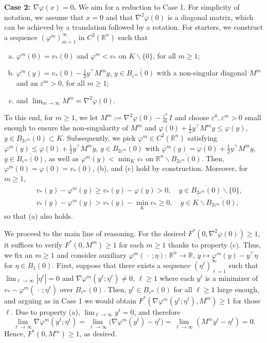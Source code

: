 \documentclass[11pt]{amsart}
\numberwithin{equation}{section}
\newcommand{\rr}{\mathbb{R}}
\begin{document}
\medskip

\noindent\textbf{Case 2: $\nabla\varphi(x)=0$.} We aim for a reduction to Case 1. For simplicity of notation, we assume that $x=0$ and that $\nabla^2\varphi(0)$ is a diagonal matrix, which can be achieved by a translation followed by a rotation. For starters, we construct a sequence $(\varphi^m)_{m=1}^\infty$ in $C^2(\rr^n)$ such that
\begin{enumerate}[(a)]
\item $\varphi^m(0)=v_*(0)$ and $\varphi^m<v_*$ on $K\backslash\{0\}$, for all $m\ge1$; 
\item $\varphi^m(y)=v_*(0)-\frac{1}{2}y^\top M^my$, $y\in\overline{B_{\varepsilon^m}(0)}$ with a non-singular diagonal $M^m$ and an $\varepsilon^m>0$, for all $m\ge1$; 
\item and $\lim_{m\to\infty} M^m=\nabla^2\varphi(0)$. 
\end{enumerate}
To this end, for $m\ge1$, we let $M^m:=\nabla^2\varphi(0)-\frac{\varepsilon^0}{m}\,I$ and choose $\varepsilon^0,\varepsilon^m>0$ small enough to ensure the non-singularity of $M^m$ and $\varphi(0)+\frac{1}{2}y^\top M^m y\le \varphi(y)$, $y\in \overline{B_{2\varepsilon^m}(0)}\subset K$. Subsequently, we pick $\varphi^m\in C^2(\rr^n)$ satisfying $\varphi^m(y)\le\varphi(0)+\frac{1}{2}y^\top M^m y$, $y\in \overline{B_{2\varepsilon^m}(0)}$ with $\varphi^m(y)=\varphi(0)+\frac{1}{2}y^\top M^m y$, $y\in \overline{B_{\varepsilon^m}(0)}$, as well as $\varphi^m(y)<\min_K v_*$ on $\rr^n\backslash \overline{B_{2\varepsilon^m}(0)}$. Then, $\varphi^m(0)=\varphi(0)=v_*(0)$, (b), and (c) hold by construction. Moreover, for $m\ge1$,
\begin{eqnarray}
&& v_*(y)-\varphi^m(y)\ge v_*(y)-\varphi(y)>0,\quad y\in \overline{B_{2\varepsilon^m}(0)}\backslash\{0\}, \\
&& v_*(y)-\varphi^m(y)>v_*(y)-\min_K v_*\ge 0,\quad y\in K\backslash \overline{B_{2\varepsilon^m}(0)},
\end{eqnarray}
 so that (a) also holds. 
 
\medskip

We proceed to the main line of reasoning. For the desired $F^*(0,\nabla^2\varphi(0))\ge1$, it suffices to verify $F^*(0,M^m)\ge 1$ for each $m\ge1$ thanks to property (c). Thus, we fix an $m\ge1$ and consider auxiliary $\varphi^m(\,\cdot\,;\eta):\,\rr^n\to\rr$, $y\mapsto\varphi^m(y)-y^\top\eta$ for $\eta\in B_1(0)$. First, suppose that there exists a sequence $(\eta^\ell)_{\ell=1}^\infty$ such that $\lim_{\ell\to\infty} |\eta^\ell|=0$ and $\nabla\varphi^m(y^\ell;\eta^\ell)\neq0$, $\ell\ge1$ where each $y^\ell$ is a minimizer of $v_*-\varphi^m(\,\cdot\,;\eta^\ell)$ over $\overline{B_{\varepsilon^m}(0)}$. Then, $y^\ell\in B_{\varepsilon^m}(0)$ for all $\ell\ge1$ large enough, and arguing as in Case 1 we would obtain $F^*(\nabla\varphi^m(y^\ell;\eta^\ell),M^m)\ge1$ for those $\ell$. Due to property (a), $\lim_{\ell\to\infty} y^\ell=0$, and therefore 
\begin{equation}
\lim_{\ell\to\infty} \nabla\varphi^m(y^\ell;\eta^\ell)
=\lim_{\ell\to\infty} \big(\nabla\varphi^m(y^\ell)-\eta^\ell\big)
=\lim_{\ell\to\infty} (M^m y^\ell-\eta^\ell)=0.
\end{equation}
Hence, $F^*(0,M^m)\ge1$, as desired.
\end{document}
